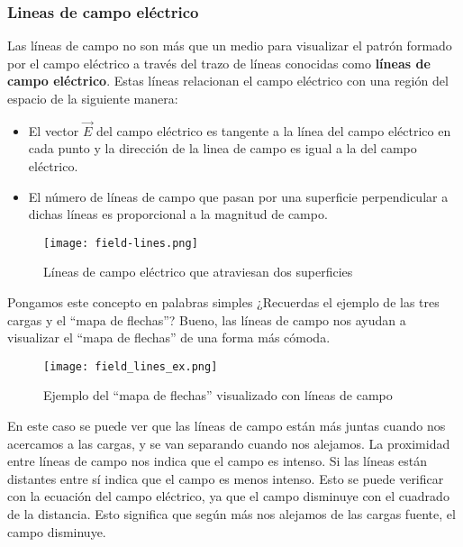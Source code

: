 \subsubsection{Lineas de campo eléctrico}

Las líneas de campo no son más que un medio para visualizar el patrón formado por el campo eléctrico a través del trazo de líneas conocidas como \textbf{líneas de campo eléctrico}. Estas líneas relacionan el campo eléctrico con una región del espacio de la siguiente manera:
\begin{itemize}
    \item El vector \(\vec{E}\) del campo eléctrico es tangente a la línea del campo eléctrico en cada punto y la dirección de la linea de campo es igual a la del campo eléctrico.
    \item El número de líneas de campo que pasan por una superficie perpendicular a dichas líneas es proporcional a la magnitud de campo.
\end{itemize}

\begin{figure}[ht]
    \centering
    \texttt{[image: field-lines.png]}
    \caption{Líneas de campo eléctrico que atraviesan dos superficies}
    \label{fig:lineas_de_campo}
\end{figure}

Pongamos este concepto en palabras simples ¿Recuerdas el ejemplo de las tres cargas y el ``mapa de flechas''? Bueno, las líneas de campo nos ayudan a visualizar el ``mapa de flechas'' de una forma más cómoda.

\begin{figure}[ht]
    \centering
    \texttt{[image: field\_lines\_ex.png]}
    \caption{Ejemplo del ``mapa de flechas'' visualizado con líneas de campo}
    \label{fig:ej_lineas_de_campo}
\end{figure}

En este caso se puede ver que las líneas de campo están más juntas cuando nos acercamos a las cargas, y se van separando cuando nos alejamos. La proximidad entre líneas de campo nos indica que el campo es intenso. Si las líneas están distantes entre sí indica que el campo es menos intenso. Esto se puede verificar con la ecuación del campo eléctrico, ya que el campo disminuye con el cuadrado de la distancia. Esto significa que según más nos alejamos de las cargas fuente, el campo disminuye.